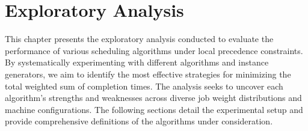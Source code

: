 \chapter{Exploratory Analysis}\label{ch:exploratory-analysis}

This chapter presents the exploratory analysis conducted to evaluate the performance of various scheduling algorithms under local precedence constraints. By systematically experimenting with different algorithms and instance generators, we aim to identify the most effective strategies for minimizing the total weighted sum of completion times. The analysis seeks to uncover each algorithm's strengths and weaknesses across diverse job weight distributions and machine configurations. The following sections detail the experimental setup and provide comprehensive definitions of the algorithms under consideration.




